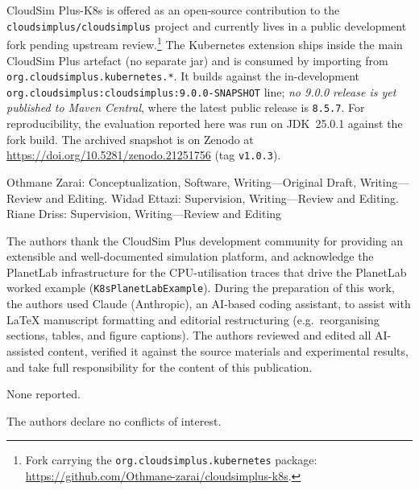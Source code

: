 \documentclass[ASNA,twocolumn]{USG}
\newcommand{\ckm}{CloudSim Plus-K8s\xspace}
\begin{document}
    \ckm is offered as an open-source contribution to the
    \texttt{cloudsimplus/cloudsimplus} project and currently lives in a
    public development fork pending upstream review.\footnote{Fork
    carrying the \texttt{org.cloudsimplus.kubernetes} package:
    \url{https://github.com/Othmane-zarai/cloudsimplus-k8s}.} The Kubernetes
    extension ships inside the main CloudSim Plus artefact (no separate
    jar) and is consumed by importing from
    \texttt{org.cloudsimplus.kubernetes.*}. It builds against the
    in-development \texttt{org.cloudsimplus:cloudsimplus:9.0.0-SNAPSHOT}
    line; \emph{no 9.0.0 release is yet published to Maven Central}, where
    the latest public release is \texttt{8.5.7}. For reproducibility, the
    evaluation reported here was run on JDK~25.0.1 against the fork build.
    The archived snapshot is on Zenodo at
    \url{https://doi.org/10.5281/zenodo.21251756} (tag \texttt{v1.0.3}).


    Othmane Zarai: Conceptualization, Software, Writing---Original Draft,
    Writing---Review and Editing. Widad Ettazi: Supervision,
    Writing---Review and Editing. Riane Driss: Supervision, Writing---Review and Editing

    The authors thank the CloudSim Plus development community for
    providing an extensible and well-documented simulation platform, and
    acknowledge the PlanetLab infrastructure for the CPU-utilisation traces
    that drive the PlanetLab worked example (\texttt{K8sPlanetLabExample}).
    During the preparation of this work, the authors used Claude
    (Anthropic), an AI-based coding assistant, to assist with LaTeX
    manuscript formatting and editorial restructuring (e.g.\ reorganising
    sections, tables, and figure captions). The authors reviewed and
    edited all AI-assisted content, verified it against the source
    materials and experimental results, and take full responsibility for
    the content of this publication.

    None reported.

    The authors declare no conflicts of interest.
\end{document}
